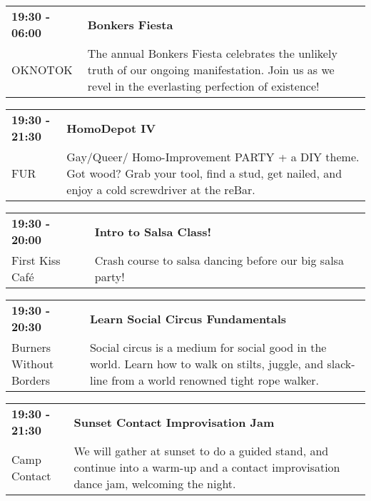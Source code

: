 \begin{tabular}{ p{1in} p{2.2in} }
    \textbf{19:30 - 06:00} & \textbf{Bonkers Fiesta} \\
    OKNOTOK \newline  & The annual Bonkers Fiesta celebrates the unlikely truth of our ongoing manifestation. Join us as we revel in the everlasting perfection of existence! \\
    \hline 
\end{tabular}
    
\begin{tabular}{ p{1in} p{2.2in} }
    \textbf{19:30 - 21:30} & \textbf{HomoDepot IV} \\
    FUR \newline  & Gay/Queer/ Homo-Improvement PARTY + a DIY theme. Got wood? Grab your tool, find a stud, get nailed, and enjoy a cold screwdriver at the reBar. \\
    \hline 
\end{tabular}
    
\begin{tabular}{ p{1in} p{2.2in} }
    \textbf{19:30 - 20:00} & \textbf{Intro to Salsa Class!} \\
    First Kiss Caf\'e \newline  & Crash course to salsa dancing before our big salsa party! \\
    \hline 
\end{tabular}
    
\begin{tabular}{ p{1in} p{2.2in} }
    \textbf{19:30 - 20:30} & \textbf{Learn Social Circus Fundamentals} \\
    Burners Without Borders \newline  & Social circus is a medium for social good in the world. Learn how to walk on stilts, juggle, and  slack-line from a world renowned tight rope walker. \\
    \hline 
\end{tabular}
    
\begin{tabular}{ p{1in} p{2.2in} }
    \textbf{19:30 - 21:30} & \textbf{Sunset Contact Improvisation Jam} \\
    Camp Contact \newline  & We will gather at sunset to do a guided stand, and continue into a warm-up and a contact improvisation dance jam, welcoming the night. \\
    \hline 
\end{tabular}
    
